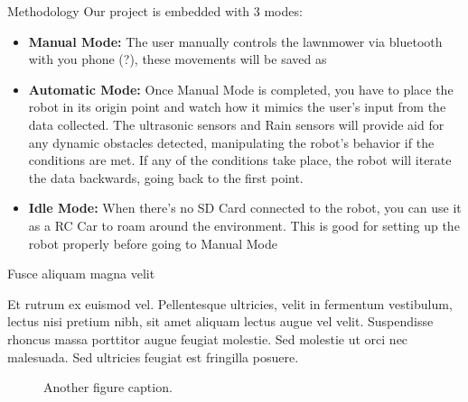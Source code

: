 \documentclass[final]{beamer}
\newlength{\colwidth}
\begin{document}
\begin{frame}[t]
\begin{columns}[t]
\begin{column}{\colwidth}
\begin{block}{Methodology}
    Our project is embedded with 3 modes:
    \begin{itemize}
        \item \textbf{Manual Mode:}
        The user manually controls the lawnmower via bluetooth with you phone (?), these movements will be saved as 
        \item \textbf{Automatic Mode:}
        Once Manual Mode is completed, you have to place the robot in its origin point and watch how it mimics the user's input from the data collected. The ultrasonic sensors and Rain sensors will provide aid for any dynamic obstacles detected, manipulating the robot's behavior if the conditions are met. If any of the conditions take place, the robot will iterate the data backwards, going back to the first point.  
        \item \textbf{Idle Mode:}
        When there's no SD Card connected to the robot, you can use it as a RC Car to roam around the environment. This is good for setting up the robot properly before going to Manual Mode
        
    \end{itemize}

  \end{block}

  \begin{block}{Fusce aliquam magna velit}

    Et rutrum ex euismod vel. Pellentesque ultricies, velit in fermentum
    vestibulum, lectus nisi pretium nibh, sit amet aliquam lectus augue vel
    velit. Suspendisse rhoncus massa porttitor augue feugiat molestie. Sed
    molestie ut orci nec malesuada. Sed ultricies feugiat est fringilla
    posuere.

    \begin{figure}
      \centering
      \caption{Another figure caption.}
    \end{figure}


\end{block}
\end{column}
\end{columns}
\end{frame}
\end{document}
